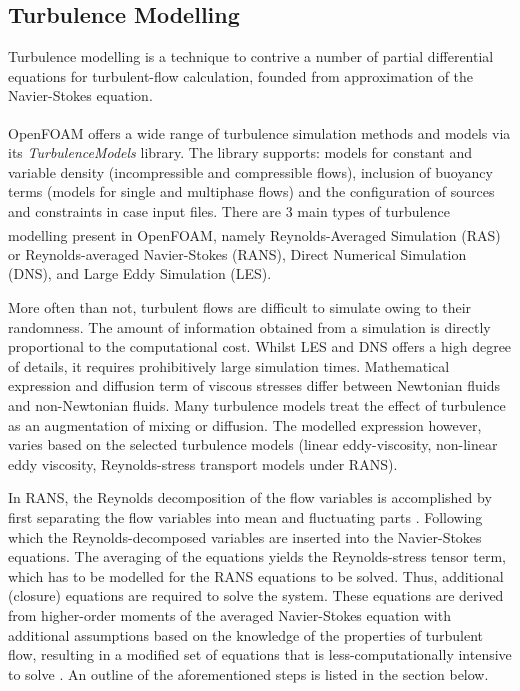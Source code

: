 \subsection{Turbulence Modelling}
Turbulence modelling is a technique to contrive a number of partial differential equations for turbulent-flow calculation, founded from approximation of the Navier-Stokes equation.

OpenFOAM\textsuperscript{\textregistered} offers a wide range of turbulence simulation methods and models via its \emph{TurbulenceModels} library. The library supports: models for constant and variable density (incompressible and compressible flows), inclusion of buoyancy terms (models for single and multiphase flows) and the configuration of sources and constraints in case input files. There are 3 main types of turbulence modelling present in OpenFOAM\textsuperscript{\textregistered}, namely Reynolds-Averaged Simulation (RAS) or Reynolds-averaged Navier-Stokes (RANS), Direct Numerical Simulation (DNS), and Large Eddy Simulation (LES).

More often than not, turbulent flows are difficult to simulate owing to their randomness. The amount of information obtained from a simulation is directly proportional to the computational cost. Whilst LES and DNS offers a high degree of details, it requires prohibitively large simulation times.
Mathematical expression and diffusion term of viscous stresses differ between Newtonian fluids and non-Newtonian fluids. Many turbulence models treat the effect of turbulence as an augmentation of mixing or diffusion. The modelled expression however, varies based on the selected turbulence models (linear eddy-viscosity, non-linear eddy viscosity, Reynolds-stress transport models under RANS).

In RANS, the Reynolds decomposition of the flow variables is accomplished by first separating the flow variables into mean and fluctuating parts \cite{Alfonsi2009}. Following which the Reynolds-decomposed variables are inserted into the Navier-Stokes equations. The averaging of the equations yields the Reynolds-stress tensor term, which has to be modelled for the RANS equations to be solved. Thus, additional (closure) equations are required to solve the system. These equations are derived from higher-order moments of the averaged Navier-Stokes equation with additional assumptions based on the knowledge of the properties of turbulent flow, resulting in a modified set of equations that is less-computationally intensive to solve \cite{Pisarenco2011}. An outline of the aforementioned steps is listed in the section below.
